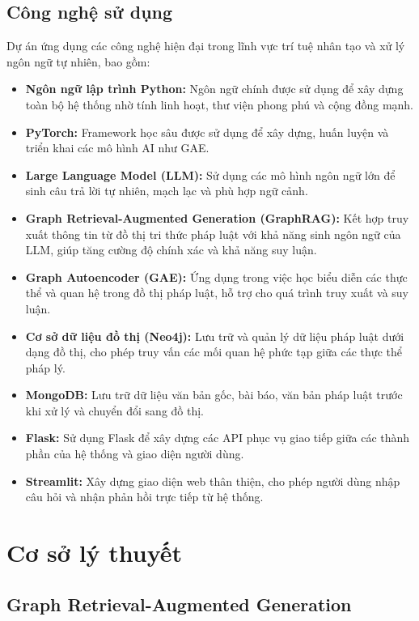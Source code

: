 \documentclass[a4paper]{article}
\begin{document}
\subsection{Công nghệ sử dụng}
Dự án ứng dụng các công nghệ hiện đại trong lĩnh vực trí tuệ nhân tạo và xử lý ngôn ngữ tự nhiên, bao gồm:
\begin{itemize}
    \item \textbf{Ngôn ngữ lập trình Python:} Ngôn ngữ chính được sử dụng để xây dựng toàn bộ hệ thống nhờ tính linh hoạt, thư viện phong phú và cộng đồng mạnh.
    \item \textbf{PyTorch:} Framework học sâu được sử dụng để xây dựng, huấn luyện và triển khai các mô hình AI như GAE.
    \item \textbf{Large Language Model (LLM):} Sử dụng các mô hình ngôn ngữ lớn để sinh câu trả lời tự nhiên, mạch lạc và phù hợp ngữ cảnh.
    \item \textbf{Graph Retrieval-Augmented Generation (GraphRAG):} Kết hợp truy xuất thông tin từ đồ thị tri thức pháp luật với khả năng sinh ngôn ngữ của LLM, giúp tăng cường độ chính xác và khả năng suy luận.
    \item \textbf{Graph Autoencoder (GAE):} Ứng dụng trong việc học biểu diễn các thực thể và quan hệ trong đồ thị pháp luật, hỗ trợ cho quá trình truy xuất và suy luận.
    \item \textbf{Cơ sở dữ liệu đồ thị (Neo4j):} Lưu trữ và quản lý dữ liệu pháp luật dưới dạng đồ thị, cho phép truy vấn các mối quan hệ phức tạp giữa các thực thể pháp lý.
    \item \textbf{MongoDB:} Lưu trữ dữ liệu văn bản gốc, bài báo, văn bản pháp luật trước khi xử lý và chuyển đổi sang đồ thị.
    \item \textbf{Flask:} Sử dụng Flask để xây dựng các API phục vụ giao tiếp giữa các thành phần của hệ thống và giao diện người dùng.
    \item \textbf{Streamlit:} Xây dựng giao diện web thân thiện, cho phép người dùng nhập câu hỏi và nhận phản hồi trực tiếp từ hệ thống.
\end{itemize}

\clearpage
\section{Cơ sở lý thuyết}
\subsection{Graph Retrieval-Augmented Generation}
\end{document}
